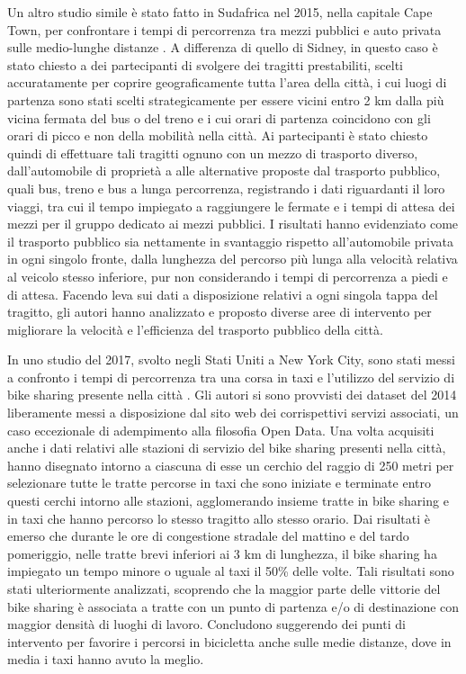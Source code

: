 Un altro studio simile è stato fatto in Sudafrica nel 2015, nella capitale Cape Town, per confrontare i tempi di percorrenza tra mezzi pubblici e auto privata sulle medio-lunghe distanze \cite{hitge2015comparison}. A differenza di quello di Sidney, in questo caso è stato chiesto a dei partecipanti di svolgere dei tragitti prestabiliti, scelti accuratamente per coprire geograficamente tutta l'area della città, i cui luogi di partenza sono stati scelti strategicamente per essere vicini entro 2 km dalla più vicina fermata del bus o del treno e i cui orari di partenza coincidono con gli orari di picco e non della mobilità nella città. Ai partecipanti è stato chiesto quindi di effettuare tali tragitti ognuno con un mezzo di trasporto diverso, dall'automobile di proprietà a alle alternative proposte dal trasporto pubblico, quali bus, treno e bus a lunga percorrenza, registrando i dati riguardanti il loro viaggi, tra cui il tempo impiegato a raggiungere le fermate e i tempi di attesa dei mezzi per il gruppo dedicato ai mezzi pubblici. I risultati hanno evidenziato come il trasporto pubblico sia nettamente in svantaggio rispetto all'automobile privata in ogni singolo fronte, dalla lunghezza del percorso più lunga alla velocità relativa al veicolo stesso inferiore, pur non considerando i tempi di percorrenza a piedi e di attesa. Facendo leva sui dati a disposizione relativi a ogni singola tappa del tragitto, gli autori hanno analizzato e proposto diverse aree di intervento per migliorare la velocità e l'efficienza del trasporto pubblico della città.

In uno studio del 2017, svolto negli Stati Uniti a New York City, sono stati messi a confronto i tempi di percorrenza tra una corsa in taxi e l'utilizzo del servizio di bike sharing presente nella città \cite{faghih2017hail}. Gli autori si sono provvisti dei dataset del 2014 liberamente messi a disposizione dal sito web dei corrispettivi servizi associati, un caso eccezionale di adempimento alla filosofia Open Data. Una volta acquisiti anche i dati relativi alle stazioni di servizio del bike sharing presenti nella città, hanno disegnato intorno a ciascuna di esse un cerchio del raggio di 250 metri per selezionare tutte le tratte percorse in taxi che sono iniziate e terminate entro questi cerchi intorno alle stazioni, agglomerando insieme tratte in bike sharing e in taxi che hanno percorso lo stesso tragitto allo stesso orario. Dai risultati è emerso che durante le ore di congestione stradale del mattino e del tardo pomeriggio, nelle tratte brevi inferiori ai 3 km di lunghezza, il bike sharing ha impiegato un tempo minore o uguale al taxi il 50\% delle volte. Tali risultati sono stati ulteriormente analizzati, scoprendo che la maggior parte delle vittorie del bike sharing è associata a tratte con un punto di partenza e/o di destinazione con maggior densità di luoghi di lavoro. Concludono suggerendo dei punti di intervento per favorire i percorsi in bicicletta anche sulle medie distanze, dove in media i taxi hanno avuto la meglio.


